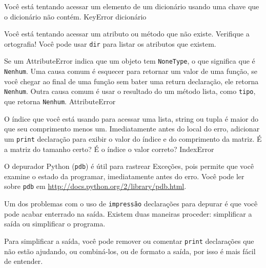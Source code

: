 \documentclass[10pt]{book}
\begin{document}
\begin{v erbatim}
\begin{description}
\begin{itemize}
\end{itemize}

\item[KeyError:] Você está tentando acessar um elemento de um dicionário
usando uma chave que o dicionário não contém.
\index{} KeyError
\index{} dicionário

\item[AttributeError:] Você está tentando acessar um atributo ou método
que não existe. Verifique a ortografia! Você pode usar
{\tt dir} para listar os atributos que existem.

Se um AttributeError indica que um objeto tem {\tt NoneType},
o que significa que é {\tt Nenhum}. Uma causa comum é esquecer
para retornar um valor de uma função, se você chegar ao final de
uma função sem bater uma {return \tt} declaração, ele retorna
{\tt Nenhum}. Outra causa comum é usar o resultado do
um método lista, como {\tt tipo}, que retorna {\tt Nenhum}.
\index{} AttributeError

\item[IndexError:] O índice que você está usando
para acessar uma lista, string ou tupla é maior do que
seu comprimento menos um. Imediatamente antes do local do erro,
adicionar um {\tt print} declaração para exibir
o valor do índice e do comprimento da matriz.
É a matriz do tamanho certo? É o índice o valor correto?
\index{} IndexError

\end{description}

O depurador Python ({\tt pdb}) é útil para rastrear
Exceções, pois permite que você examine o estado da
programar, imediatamente antes do erro. Você pode ler
sobre {\tt pdb} em \url{http://docs.python.org/2/library/pdb.html}.



Um dos problemas com o uso de {\tt impressão} declarações para depurar
é que você pode acabar enterrado na saída. Existem duas maneiras
proceder: simplificar a saída ou simplificar o programa.

Para simplificar a saída, você pode remover ou comentar {\tt print}
declarações que não estão ajudando, ou combiná-los, ou de formato
a saída, por isso é mais fácil de entender.


\end{v erbatim}
\end{document}
